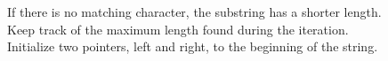 \documentclass[preview]{standalone}
\begin{document}
If there is no matching character, the substring has a shorter length.\\Keep track of the maximum length found during the iteration.\\Initialize two pointers, left and right, to the beginning of the string.\\
\end{document}
